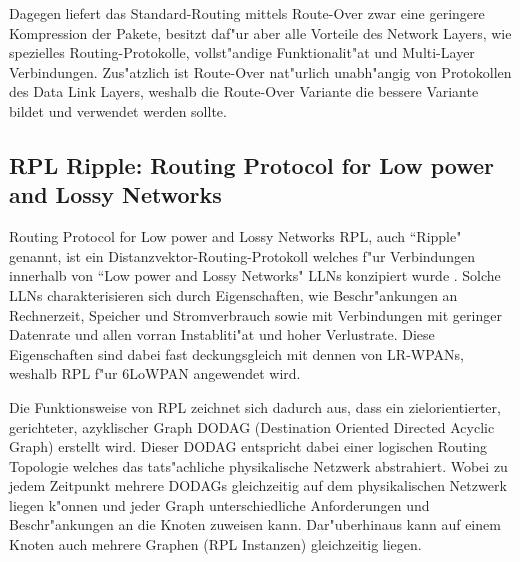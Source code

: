 \documentclass[final]{lktseminar}
\begin{document}
\begin{description}
    Dagegen liefert das Standard-Routing mittels Route-Over zwar eine geringere Kompression der Pakete, besitzt
    daf"ur aber alle Vorteile des Network Layers, wie spezielles Routing-Protokolle, vollst"andige Funktionalit"at
    und Multi-Layer Verbindungen. Zus"atzlich ist Route-Over nat"urlich unabh"angig von Protokollen des Data Link Layers,
    weshalb die Route-Over Variante die bessere Variante bildet und verwendet werden sollte.

\end{description}




\subsection{RPL Ripple: Routing Protocol for Low power and Lossy Networks}
\label{sec: RPL Ripple}

Routing Protocol for Low power and Lossy Networks RPL, auch ``Ripple" genannt, ist ein
Distanzvektor-Routing-Protokoll welches f"ur Verbindungen innerhalb von ``Low power and Lossy Networks" LLNs
konzipiert wurde \cite{rfc6550}. Solche LLNs charakterisieren sich durch Eigenschaften,
wie Beschr"ankungen an Rechnerzeit, Speicher und Stromverbrauch sowie mit Verbindungen mit
geringer Datenrate und allen vorran Instabliti"at und hoher Verlustrate. Diese Eigenschaften
sind dabei fast deckungsgleich mit dennen von LR-WPANs, weshalb RPL f"ur 6LoWPAN angewendet wird.

Die Funktionsweise von RPL zeichnet sich dadurch aus, dass ein zielorientierter, gerichteter,
 azyklischer Graph DODAG (Destination Oriented Directed Acyclic Graph)\cite{rpl_ipso} erstellt wird.
 Dieser DODAG entspricht dabei einer logischen Routing Topologie welches das
 tats"achliche  physikalische Netzwerk abstrahiert. Wobei zu jedem Zeitpunkt
 mehrere DODAGs gleichzeitig auf dem physikalischen Netzwerk liegen k"onnen und jeder
 Graph unterschiedliche Anforderungen und Beschr"ankungen an die Knoten zuweisen kann.
 Dar"uberhinaus kann auf einem Knoten auch mehrere Graphen (RPL Instanzen) gleichzeitig liegen.
\end{document}
